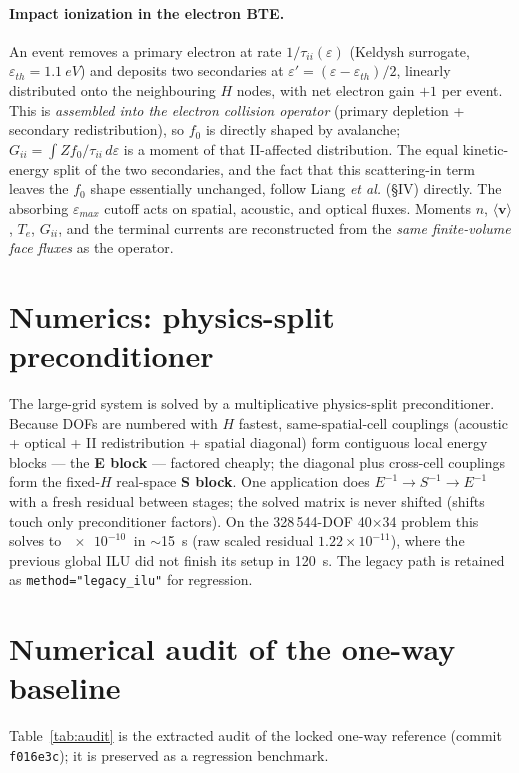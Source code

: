 \documentclass[11pt]{article}
\newcommand{\eps}{\varepsilon}
\begin{document}
\paragraph{Impact ionization in the electron BTE.} An event removes a primary electron at rate
$1/\tau_{ii}(\eps)$ (Keldysh surrogate, $\eps_{th}=\SI{1.1}{eV}$) and deposits two secondaries at
$\eps'=(\eps-\eps_{th})/2$, linearly distributed onto the neighbouring $H$ nodes, with net
electron gain $+1$ per event. This is \emph{assembled into the electron collision operator}
(primary depletion + secondary redistribution), so $f_0$ is directly shaped by avalanche;
$G_{ii}=\int Zf_0/\tau_{ii}\,d\eps$ is a moment of that II-affected distribution. The equal
kinetic-energy split of the two secondaries, and the fact that this scattering-in term leaves the
$f_0$ shape essentially unchanged, follow Liang \emph{et al.} (\S IV) directly. The absorbing
$\eps_{max}$ cutoff acts on spatial, acoustic, and optical fluxes. Moments $n$, $\langle
\mathbf{v}\rangle$, $T_e$, $G_{ii}$, and the terminal currents are reconstructed from the
\emph{same finite-volume face fluxes} as the operator.

\section{Numerics: physics-split preconditioner}\label{sec:numerics}
The large-grid system is solved by a multiplicative physics-split preconditioner. Because DOFs
are numbered with $H$ fastest, same-spatial-cell couplings (acoustic + optical + II
redistribution + spatial diagonal) form contiguous local energy blocks --- the \textbf{E block}
--- factored cheaply; the diagonal plus cross-cell couplings form the fixed-$H$ real-space
\textbf{S block}. One application does $E^{-1}\!\to\!S^{-1}\!\to\!E^{-1}$ with a fresh residual
between stages; the solved matrix is never shifted (shifts touch only preconditioner factors).
On the 328\,544-DOF 40$\times$34 problem this solves to $\SI{e-10}{}$ in $\sim$15~s (raw scaled
residual $1.22\times10^{-11}$), where the previous global ILU did not finish its setup in
120~s. The legacy path is retained as \texttt{method="legacy\_ilu"} for regression.

\section{Numerical audit of the one-way baseline}\label{sec:audit}
Table~\ref{tab:audit} is the extracted audit of the locked one-way reference (commit
\texttt{f016e3c}); it is preserved as a regression benchmark.
\end{document}
